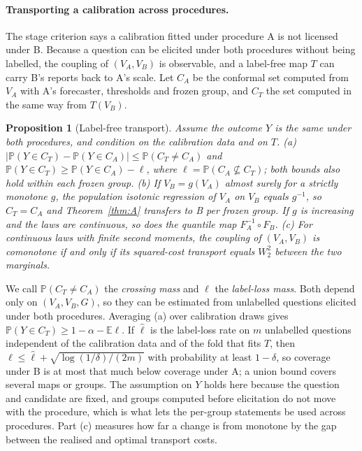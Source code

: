 \documentclass[twoside]{article}
\newtheorem{proposition}[theorem]{Proposition}
\theoremstyle{definition}
\theoremstyle{remark}
\newcommand{\E}{\mathbb{E}}
\renewcommand{\P}{\mathbb{P}}
\newcommand{\1}{\mathbf{1}}
\begin{document}
\paragraph{Transporting a calibration across procedures.} The stage criterion says a calibration
fitted under procedure A is not licensed under B. Because a question can be elicited under both
procedures without being labelled, the coupling of $(V_A,V_B)$ is observable, and a label-free map
$T$ can carry B's reports back to A's scale. Let $C_A$ be the conformal set computed from $V_A$ with
A's forecaster, thresholds and frozen group, and $C_T$ the set computed in the same way from
$T(V_B)$.

\begin{proposition}[Label-free transport]
\label{prop:transport}
Assume the outcome $Y$ is the same under both procedures, and condition on the calibration data and on $T$.
(a) $|\P(Y\in C_T)-\P(Y\in C_A)|\le\P(C_T\ne C_A)$ and $\P(Y\in C_T)\ge\P(Y\in C_A)-\ell$, where
$\ell=\P(C_A\not\subseteq C_T)$; both bounds also hold within each frozen group.
(b) If $V_B=g(V_A)$ almost surely for a strictly monotone $g$, the population isotonic regression of $V_A$ on
$V_B$ equals $g^{-1}$, so $C_T=C_A$ and Theorem~\ref{thm:A} transfers to B per frozen group. If $g$ is
increasing and the laws are continuous, so does the quantile map $F_A^{-1}\circ F_B$.
(c) For continuous laws with finite second moments, the coupling of $(V_A,V_B)$ is comonotone if and only if its
squared-cost transport equals $W_2^2$ between the two marginals.
\end{proposition}
We call $\P(C_T\ne C_A)$ the \emph{crossing mass} and $\ell$ the \emph{label-loss mass}. Both depend only on
$(V_A,V_B,G)$, so they can be estimated from unlabelled questions elicited under both procedures. Averaging (a)
over calibration draws gives $\P(Y\in C_T)\ge1-\alpha-\E\ell$. If $\hat\ell$ is the label-loss rate on $m$
unlabelled questions independent of the calibration data and of the fold that fits $T$, then
$\ell\le\hat\ell+\sqrt{\log(1/\delta)/(2m)}$ with probability at least $1-\delta$, so coverage under B is at most that
much below coverage under A; a union bound covers several maps or groups. The assumption on $Y$ holds here
because the question and candidate are fixed, and groups computed before elicitation do not move with the
procedure, which is what lets the per-group statements be used across procedures. Part (c) measures how far a
change is from monotone by the gap between the realised and optimal transport costs.
\end{document}
